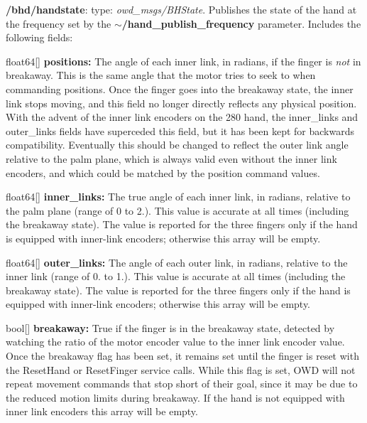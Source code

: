 \begin{DoxyItemize}
\item {\bfseries /bhd/handstate}\-: type\-: {\itshape owd\-\_\-msgs/\-B\-H\-State}. Publishes the state of the hand at the frequency set by the {\bfseries $\sim$/hand\-\_\-publish\-\_\-frequency} parameter. Includes the following fields\-:
\begin{DoxyItemize}
\item float64\mbox{[}\mbox{]} {\bfseries positions\-:} The angle of each inner link, in radians, if the finger is {\itshape not} in breakaway. This is the same angle that the motor tries to seek to when commanding positions. Once the finger goes into the breakaway state, the inner link stops moving, and this field no longer directly reflects any physical position. With the advent of the inner link encoders on the 280 hand, the inner\-\_\-links and outer\-\_\-links fields have superceded this field, but it has been kept for backwards compatibility. Eventually this should be changed to reflect the outer link angle relative to the palm plane, which is always valid even without the inner link encoders, and which could be matched by the position command values.
\item float64\mbox{[}\mbox{]} {\bfseries inner\-\_\-links\-:} The true angle of each inner link, in radians, relative to the palm plane (range of 0 to 2.). This value is accurate at all times (including the breakaway state). The value is reported for the three fingers only if the hand is equipped with inner-\/link encoders; otherwise this array will be empty.
\item float64\mbox{[}\mbox{]} {\bfseries outer\-\_\-links\-:} The angle of each outer link, in radians, relative to the inner link (range of 0. to 1.). This value is accurate at all times (including the breakaway state). The value is reported for the three fingers only if the hand is equipped with inner-\/link encoders; otherwise this array will be empty.
\item bool\mbox{[}\mbox{]} {\bfseries breakaway\-:} True if the finger is in the breakaway state, detected by watching the ratio of the motor encoder value to the inner link encoder value. Once the breakaway flag has been set, it remains set until the finger is reset with the Reset\-Hand or Reset\-Finger service calls. While this flag is set, O\-W\-D will not repeat movement commands that stop short of their goal, since it may be due to the reduced motion limits during breakaway. If the hand is not equipped with inner link encoders this array will be empty.

\end{DoxyItemize}
\end{DoxyItemize}
